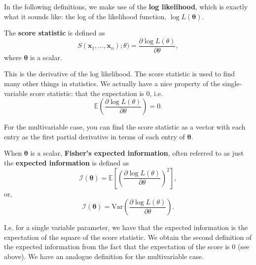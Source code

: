\bigskip

In the following definitions, we make use of the \textbf{log likelihood}, which is exactly what it sounds like: the log of the likelihood function, \(\log L(\bm{\theta})\). 

\begin{definition}\label{defn:score stat}
    The \textbf{score statistic} is defined as 
    \begin{equation}\label{eq:score stat}
        S(\bm{x}_1,...,\bm{x}_n);\theta) = \frac{\partial \log L(\theta)}{\partial \theta},
    \end{equation}
    where \(\bm{\theta}\) is a scalar. 
\end{definition}

This is the derivative of the log likelihood. 
The score statistic is used to find many other things in statistics. 
We actually have a nice property of the single-variable score statistic: that the expectation is \(0\), i.e. \[\mathbb{E}\left(\frac{\partial \log L(\theta)}{\partial \theta}\right) = 0.\]

\medskip 

For the multivariable case, you can find the score statistic as a vector with each entry as the first partial derivative in terms of each entry of \(\bm{\theta}\). 

\begin{definition}\label{defn:expected information - single}
    When \(\bm{\theta}\) is a scalar, \textbf{Fisher's expected information}, often referred to as just the \textbf{expected information} is defined as 
    \begin{equation}\label{eq:expected info sing E score}
        \mathscr{I}(\bm{\theta}) = \mathbb{E}\left[\left(\frac{\partial \log L(\theta)}{\partial \theta}\right)^2\right],
    \end{equation}
    or, 
    \begin{equation}\label{eq:expected info sing Var score}
        \mathscr{I}(\bm{\theta}) = \text{Var}\left(\frac{\partial \log L(\theta)}{\partial \theta}\right).
    \end{equation}
\end{definition}

I.e. for a single variable parameter, we have that the expected information is the expectation of the square of the score statistic. 
We obtain the second definition of the expected information from the fact that the expectation of the score is \(0\) (see above). 
We have an analogue definition for the multivariable case. 

